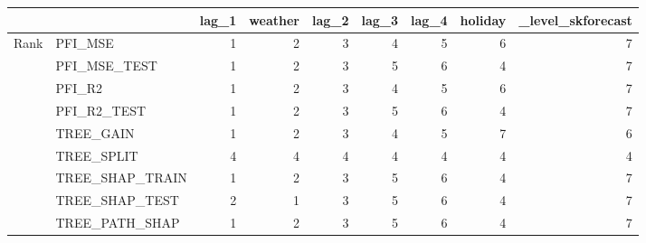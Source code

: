 \begin{tabular}{llrrrrrrr}
\toprule
 &  & lag_1 & weather & lag_2 & lag_3 & lag_4 & holiday & _level_skforecast \\
\midrule
\multirow[t]{9}{*}{Rank} & PFI_MSE & 1 & 2 & 3 & 4 & 5 & 6 & 7 \\
 & PFI_MSE_TEST & 1 & 2 & 3 & 5 & 6 & 4 & 7 \\
 & PFI_R2 & 1 & 2 & 3 & 4 & 5 & 6 & 7 \\
 & PFI_R2_TEST & 1 & 2 & 3 & 5 & 6 & 4 & 7 \\
 & TREE_GAIN & 1 & 2 & 3 & 4 & 5 & 7 & 6 \\
 & TREE_SPLIT & 4 & 4 & 4 & 4 & 4 & 4 & 4 \\
 & TREE_SHAP_TRAIN & 1 & 2 & 3 & 5 & 6 & 4 & 7 \\
 & TREE_SHAP_TEST & 2 & 1 & 3 & 5 & 6 & 4 & 7 \\
 & TREE_PATH_SHAP & 1 & 2 & 3 & 5 & 6 & 4 & 7 \\
\cline{1-9}
\bottomrule
\end{tabular}
